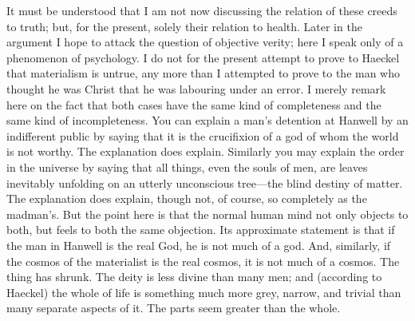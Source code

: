 It must be understood that I am not now discussing the relation of these creeds to truth; but, for the present, solely their relation to health. Later in the argument I hope to attack the question of objective verity; here I speak only of a phenomenon of psychology. I do not for the present attempt to prove to Haeckel that materialism is untrue, any more than I attempted to prove to the man who thought he was Christ that he was labouring under an error. I merely remark here on the fact that both cases have the same kind of completeness and the same kind of incompleteness. You can explain a man’s detention at Hanwell by an indifferent public by saying that it is the crucifixion of a god of whom the world is not worthy. The explanation does explain. Similarly you may explain the order in the universe by saying that all things, even the souls of men, are leaves inevitably unfolding on an utterly unconscious tree—the blind destiny of matter. The explanation does explain, though not, of course, so completely as the madman’s. But the point here is that the normal human mind not only objects to both, but feels to both the same objection. Its approximate statement is that if the man in Hanwell is the real God, he is not much of a god. And, similarly, if the cosmos of the materialist is the real cosmos, it is not much of a cosmos. The thing has shrunk. The deity is less divine than many men; and (according to Haeckel) the whole of life is something much more grey, narrow, and trivial than many separate aspects of it. The parts seem greater than the whole.

